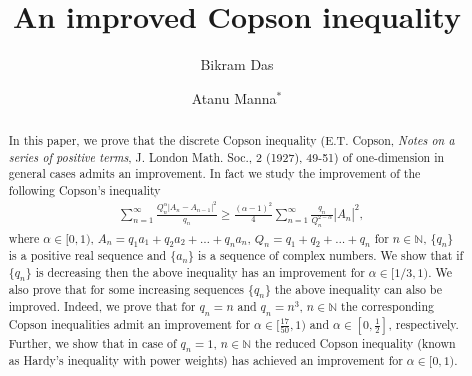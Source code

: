 \documentclass[12pt]{amsart}
\theoremstyle{definition}
\theoremstyle{plain}
\theoremstyle{definition}
\numberwithin{equation}{section}
\begin{document}
\title[ An improved Copson inequality]
{ An improved Copson inequality}


\author[Das]{Bikram Das}
\address{Dr. APJ Abdul Kalam Technical University, Lucknow-226021 \&
Indian Institute of Carpet Technology, Chauri Road, Bhadohi- 221401, Uttar Pradesh, India}
\author[Manna]{Atanu Manna$^*$ }
\address{Indian Institute of Carpet Technology, Bhadohi-221401, Uttar Pradesh, India}





\begin{abstract}
  In this paper, we prove that the discrete Copson inequality (E.T. Copson, \emph{Notes on a series of positive terms}, J. London Math. Soc., 2 (1927), 49-51) of one-dimension in general cases admits an improvement. In fact we study the improvement of the following Copson's inequality
\begin{align*}
&\displaystyle\sum_{n=1}^{\infty}\frac{Q_{n}^{\alpha}|A_n-A_{n-1}|^{2}}{q_{n}}\geq\frac{(\alpha-1)^2}{4}\displaystyle\sum_{n=1}^{\infty}
\frac{q_{n}}{Q_{n}^{2-\alpha}}|A_{n}|^{2},
\end{align*}where $\alpha\in[0,1)$, $A_{n}=q_{1}a_{1}+ q_{2}a_{2}+ \ldots +q_{n}a_{n}$, $Q_{n}=q_1+q_2+\ldots+q_{n}$ for $n\in \mathbb{N}$, $\{q_n\}$ is a positive real sequence and $\{a_n\}$ is a sequence of complex numbers. We show that if $\{q_n\}$ is decreasing then the above inequality has an improvement for $\alpha\in [1/3, 1)$. We also prove that for some increasing sequences $\{q_n\}$ the above inequality can also be improved. Indeed, we prove that for $q_{n}=n$ and $q_n=n^3$, $n\in \mathbb{N}$ the corresponding Copson inequalities admit an improvement for $\alpha\in[\frac{17}{50}, 1)$ and $\alpha\in[0, \frac{1}{2}]$, respectively. Further, we show that in case of $q_{n}=1$, $n\in \mathbb{N}$ the reduced Copson inequality (known as Hardy's inequality with power weights) has achieved an improvement for $\alpha\in[0,1)$.
\end{abstract}
\maketitle
\end{document}
